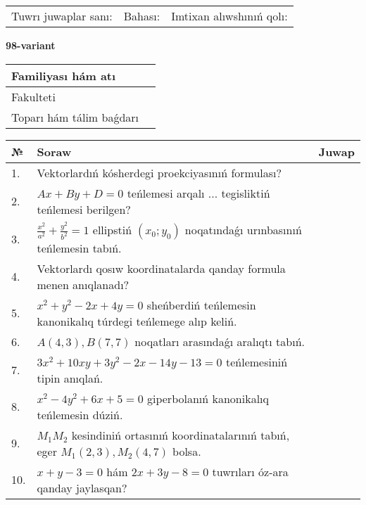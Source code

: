 \documentclass{article}
\begin{document}
\vspace{1cm}

\begin{tabular}{lll}
Tuwrı juwaplar sanı: \underline{\hspace{1.5cm}} & 
Bahası: \underline{\hspace{1.5cm}} & 
Imtixan alıwshınıń qolı: \underline{\hspace{2cm}} \\
\end{tabular}

\egroup

\newpage


\textbf{98-variant}\\

\bgroup
\def\arraystretch{1.6} %

\begin{tabular}{|m{5.7cm}|m{9.5cm}|}
\hline
Familiyası hám atı & \\
\hline
Fakulteti  & \\
\hline
Toparı hám tálim baǵdarı  & \\
\hline
\end{tabular}

\vspace{1cm}

\begin{tabular}{|m{0.7cm}|m{10cm}|m{4cm}|}
\hline
№ & Soraw & Juwap \\
\hline
1. & Vektorlardıń kósherdegi proekciyasınıń formulası? &  \\
\hline
2. & $Ax+By+D=0$ teńlemesi arqalı ... tegisliktiń teńlemesi berilgen? &  \\
\hline
3. & $\frac{x^2}{a^2}+\frac{y^2}{b^2}=1$ ellipstiń $(x_0;y_0)$ noqatındaǵı urınbasınıń teńlemesin tabıń. &  \\
\hline
4. & Vektorlardı qosıw koordinatalarda qanday formula menen anıqlanadı? &  \\
\hline
5. & $x^{2}+y^{2}-2x+4y=0$ sheńberdiń teńlemesin kanonikalıq túrdegi teńlemege alıp keliń. &  \\
\hline
6. & $A(4, 3), B(7, 7)$ noqatları arasındaǵı aralıqtı tabıń. &  \\
\hline
7. & $3x^{2}+10xy+3y^{2}-2x-14y-13=0$ teńlemesiniń tipin anıqlań. &  \\
\hline
8. & $x^{2}-4y^{2}+6x+5=0$ giperbolanıń kanonikalıq teńlemesin dúziń. &  \\
\hline
9. & $M_{1}M_{2}$ kesindiniń ortasınıń koordinatalarınıń tabıń, eger $M_{1} (2, 3), M_{2} (4, 7)$ bolsa. &  \\
\hline
10. & $x+y-3=0$ hám $2x+3y-8=0$ tuwrıları óz-ara qanday jaylasqan? &  \\
\hline
\end{tabular}
\end{document}
